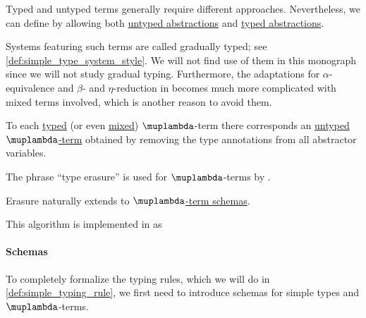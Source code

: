 \begin{remark}\label{rem:mixed_lambda_term}\mimprovised
  Typed and untyped terms generally require different approaches. Nevertheless, we can define  by allowing both \hyperref[def:lambda_term]{untyped abstractions} and \hyperref[def:typed_lambda_term]{typed abstractions}.

  Systems featuring such terms are called gradually typed; see \cref{def:simple_type_system_style}. We will not find use of them in this monograph since we will not study gradual typing. Furthermore, the adaptations for \( \alpha \)-equivalence and \( \beta \)- and \( \eta \)-reduction in  becomes much more complicated with mixed terms involved, which is another reason to avoid them.
\end{remark}

\begin{algorithm}\label{alg:type_erasure}
  To each \hyperref[def:typed_lambda_term]{typed} (or even \hyperref[rem:mixed_lambda_term]{mixed}) \( \muplambda \)-term there corresponds an \hyperref[def:lambda_term]{untyped \( \muplambda \)-term} obtained by removing the type annotations from all abstractor variables.
\end{algorithm}
\begin{comments}
  \item The phrase \enquote{type erasure} is used for \( \muplambda \)-terms by \textcite[def. 5A2]{Hindley1997BasicSTT}.
  \item Erasure naturally extends to \hyperref[def:simple_type_schema]{\( \muplambda \)-term schemas}.
  \item This algorithm is implemented in \cite{notebook:code} as
  \begin{CodeRefDisplay}
  \end{CodeRefDisplay}
\end{comments}

\paragraph{Schemas}

To completely formalize the typing rules, which we will do in \cref{def:simple_typing_rule}, we first need to introduce schemas for simple types and \( \muplambda \)-terms.

